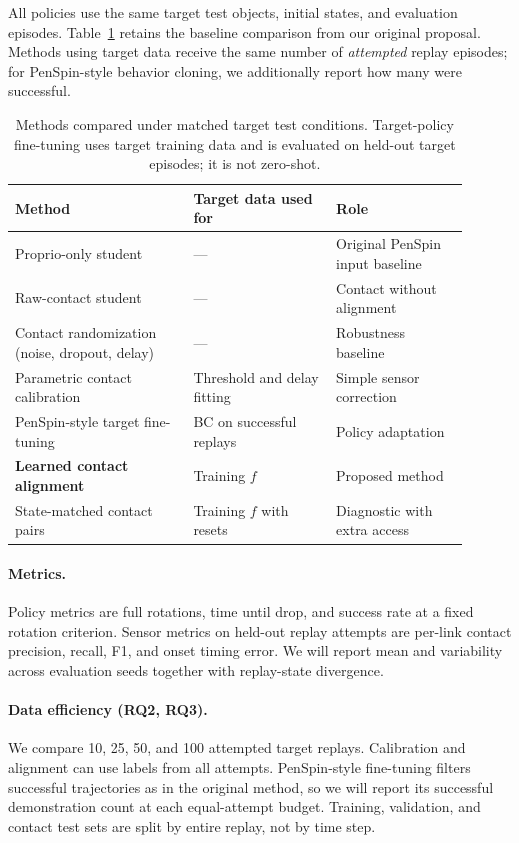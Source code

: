 All policies use the same target test objects, initial states, and evaluation episodes. Table~\ref{tab:methods} retains the baseline comparison from our original proposal. Methods using target data receive the same number of \emph{attempted} replay episodes; for PenSpin-style behavior cloning, we additionally report how many were successful.

\begin{table}[htbp]
\centering
\small
\begin{tabular}{@{}>{\raggedright\arraybackslash}p{0.35\linewidth}>{\raggedright\arraybackslash}p{0.29\linewidth}>{\raggedright\arraybackslash}p{0.26\linewidth}@{}}
\toprule
Method & Target data used for & Role \\
\midrule
Proprio-only student & --- & Original PenSpin input baseline \\
Raw-contact student & --- & Contact without alignment \\
Contact randomization (noise, dropout, delay) & --- & Robustness baseline \\
Parametric contact calibration~\citep{real2sim2real2026} & Threshold and delay fitting & Simple sensor correction \\
PenSpin-style target fine-tuning~\citep{wang2024penspin} & BC on successful replays & Policy adaptation \\
\textbf{Learned contact alignment} & Training $f$ & Proposed method \\
State-matched contact pairs & Training $f$ with resets & Diagnostic with extra access \\
\bottomrule
\end{tabular}
\caption{Methods compared under matched target test conditions. Target-policy fine-tuning uses target training data and is evaluated on held-out target episodes; it is not zero-shot.}
\label{tab:methods}
\end{table}

\paragraph{Metrics.}
Policy metrics are full rotations, time until drop, and success rate at a fixed rotation criterion. Sensor metrics on held-out replay attempts are per-link contact precision, recall, F1, and onset timing error. We will report mean and variability across evaluation seeds together with replay-state divergence.

\paragraph{Data efficiency (RQ2, RQ3).}
We compare 10, 25, 50, and 100 attempted target replays. Calibration and alignment can use labels from all attempts. PenSpin-style fine-tuning filters successful trajectories as in the original method, so we will report its successful demonstration count at each equal-attempt budget. Training, validation, and contact test sets are split by entire replay, not by time step.

